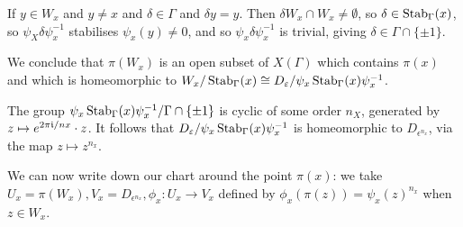 \documentclass[10pt,a4paper]{article}
\begin{document}
If $y \in W_x$ and $y \neq x$ and $\delta \in \Gamma$ and $\delta y = y$. Then $\delta W_x \cap W_x \neq \emptyset$, so $\delta \in \operatorname{Stab}_\Gamma(x)$, so $\psi_X \delta \psi_x^{-1}$ stabilises $\psi_x(y) \neq 0$, and so $\psi_x \delta \psi_x^{-1}$ is trivial, giving $\delta \in \Gamma \cap \{\pm 1\}$.

We conclude that $\pi(W_x)$ is an open subset of $X(\Gamma)$ which contains $\pi(x)$ and which is homeomorphic to $W_x/\operatorname{Stab}_\Gamma(x) \cong D_\varepsilon/ \psi_x \operatorname{Stab}_\Gamma(x) \psi_x^{-1}$.

The group $\psi_x \operatorname{Stab}_\Gamma(x) \psi_x^{-1} / \Gamma \cap \{\pm 1\}$ is cyclic of some order $n_X$, generated by $z \mapsto e^{2\pi\mathfrak{i}/nx}\cdot z$. It follows that $D_\varepsilon/ \psi_x \operatorname{Stab}_\Gamma(x)\psi_x^{-1}$ is homeomorphic to $D_{\epsilon^{n_x}}$, via the map $z \mapsto z^{n_x}$.

We can now write down our chart around the point $\pi(x)$: we take $U_x = \pi(W_x), V_x =D_{\epsilon^{n_x}}, \phi_x:U_x \to V_x$ defined by $\phi_x(\pi(z)) = \psi_x(z)^{n_x}$ when $z \in W_x$.
\end{document}
